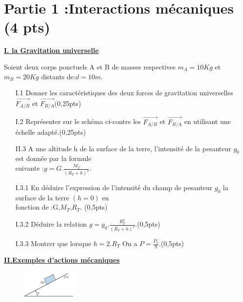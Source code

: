 \documentclass[12pt]{article}
\begin{document}
 \section*{Partie 1 :Interactions mécaniques \dotfill(4 pts)}

\begin{center}
			\underline{\textbf{I. la Gravitation universelle } }
\end{center}
 
Soient deux corps ponctuels A et B de masses respectives $m_A = 10Kg$ et $m_B=20Kg$
distants de:$d =10m$.

\begin{enumerate}

	\item[I.1] Donner les caractéristiques des deux forces de gravitation universelles               $\vec{F_{A/B}}$ et $\vec{F_{B/A}}$\dotfill(0,25pts)
	\item[I.2] Représenter sur le schéma ci-contre les  $\vec{F_{A/B}}$ et $\vec{F_{B/A}}$ en utilisant une échelle adapté.\dotfill(0,25pts)
\item[II.3] A une altitude h de la surface de la terre, l’intensité de la pesanteur $g_0$ est donnée par la formule \\suivante :$g = G.\frac{M_T}{(R_T + h)^2}$.

\item[I.3.1] En déduire l’expression de l’intensité du champ de pesanteur
$g_0$ la surface de la terre $(h=0)$ en \\fonction de :G,$M_T$,$R_T$. \dotfill(0,5pts)

\item[I.3.2] Déduire la relation $g=g_0.\frac{R_T^2}{(R_T + h)^2}$.\dotfill(0,5pts)
\item[I.3.3] Montrer que lorsque $h = 2.R_T$ On a $P=\frac{P_0}{9}$.\dotfill(0,5pts)
 \end{enumerate}
\begin{center}
	\vspace{0.99cm}
			\underline{\textbf{II.Exemples d’actions mécaniques } }
\end{center}


\begin{figure}
	
	\vspace{-1.8cm}
	\includegraphics[width=0.25\textwidth]{./img/plan pi.png}
\end{figure}
\end{document}
